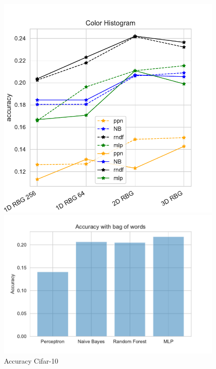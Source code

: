 \documentclass[11pt]{article}
\begin{document}
\begin{figure}[H]
\begin{minipage}[c]{0.5\textwidth}
\includegraphics[width=1\linewidth]{figures/Cifar/Accuracy_color_hist.pdf}
\end{minipage}
\begin{minipage}[c]{0.5\textwidth}
\includegraphics[width=1\linewidth]{figures/Cifar/Accuracy_BOW.pdf}
\end{minipage}
\caption{Accuracy Cifar-10}
\label{Accuracy_Cifar}
\end{figure}
\end{document}
